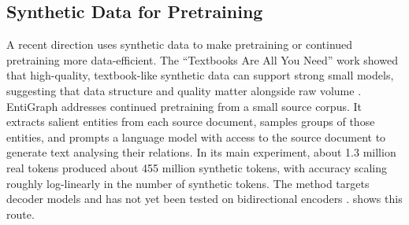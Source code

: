 \subsection{Synthetic Data for Pretraining}

A recent direction uses synthetic data to make pretraining or continued pretraining more
data-efficient. The ``Textbooks Are All You Need'' work showed that high-quality,
textbook-like synthetic data can support strong small models, suggesting that data structure
and quality matter alongside raw volume \citep{gunasekar2023textbooks}. EntiGraph addresses
continued pretraining from a small source corpus. It extracts salient entities from each
source document, samples groups of those entities, and prompts a language model with access
to the source document to generate text analysing their relations. In its main experiment,
about 1.3 million real tokens produced about 455 million synthetic tokens, with accuracy
scaling roughly log-linearly in the number of synthetic tokens. The method targets decoder
models and has not yet been tested on bidirectional encoders \citep{yang2025entigraph}.
 shows this route.

